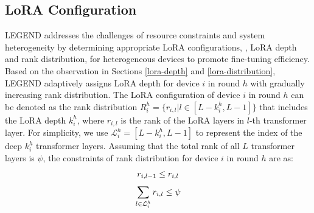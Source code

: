 \subsection{LoRA Configuration}
\vspace{-0.1cm}
LEGEND addresses the challenges of resource constraints and system heterogeneity by determining appropriate LoRA configurations, \ie, LoRA depth and rank distribution, for heterogeneous devices to promote fine-tuning efficiency. 
Based on the observation in Sections \ref{lora-depth} and \ref{lora-distribution}, LEGEND adaptively assigns LoRA depth for device $i$ in round $h$ with gradually increasing rank distribution.
The LoRA configuration of device $i$ in round $h$ can be denoted as the rank distribution $R_i^h = \{ r_{i,l} | l \in [L - k_i^h, L - 1]\}$ that includes the LoRA depth $k_i^h$, where $r_{i,l}$ is the rank of the LoRA layers in $l$-th transformer layer.
For simplicity, we use $\mathcal{L}_i^h = [L - k_i^h, L - 1]$ to represent the index of the deep $k_i^h$ transformer layers. 
Assuming that the total rank of all $L$ transformer layers is $\psi$, the constraints of rank distribution for device $i$ in round $h$ are as:
\vspace{-0.2cm}
\begin{equation}
    r_{i,l - 1} \leq r_{i,l}
    \vspace{-0.1cm}
\end{equation}
\begin{equation}
    \sum_{l \in \mathcal{L}_i^h} r_{i,l} \leq \psi
    \vspace{-0.1cm}
\end{equation}

